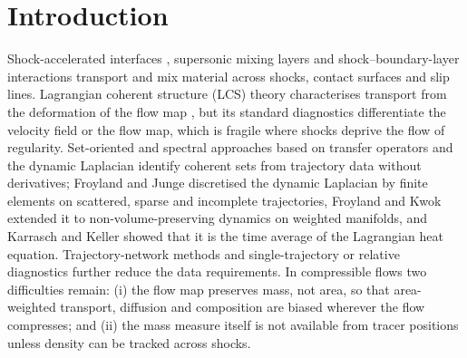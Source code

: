 \documentclass[11pt]{article}
\theoremstyle{definition}\newtheorem{definition}{Definition}\theoremstyle{remark}\newtheorem{remark}{Remark}
\begin{document}
\begin{abstract}
parts whose sum is exact; in three DNS both parts agree with the DNS velocity circulation of the same material triangles to within $3\%$, and per unit interface length it follows the Samtaney--Zabusky local law only on the upstream $45^\circ$. A tetrahedral ledger is exact across manufactured three-dimensional planar shocks. A noise propagation law, an adaptive anchoring rule and a per-track ledger for broken trajectories make the method applicable to particle-tracking data.
\end{abstract}

\section{Introduction}
Shock-accelerated interfaces \citep{HaasSturtevant1987,PiconeBoris1988,SamtaneyZabusky1994}, supersonic mixing layers and shock--boundary-layer interactions transport and mix material across shocks, contact surfaces and slip lines. Lagrangian coherent structure (LCS) theory characterises transport from the deformation of the flow map \citep{Haller2015,Hadjighasem2017}, but its standard diagnostics differentiate the velocity field or the flow map, which is fragile where shocks deprive the flow of regularity. Set-oriented and spectral approaches based on transfer operators and the dynamic Laplacian \citep{Froyland2015} identify coherent sets from trajectory data without derivatives; Froyland and Junge \citep{FroylandJunge2018} discretised the dynamic Laplacian by finite elements on scattered, sparse and incomplete trajectories, Froyland and Kwok \citep{FroylandKwok2020} extended it to non-volume-preserving dynamics on weighted manifolds, and Karrasch and Keller \citep{KarraschKeller2020} showed that it is the time average of the Lagrangian heat equation. Trajectory-network methods \citep{Iacobello2021,PadbergGehle2017,BanischKoltai2017} and single-trajectory or relative diagnostics \citep{Haller2021,Aksamit2024} further reduce the data requirements. In compressible flows two difficulties remain: (i) the flow map preserves mass, not area, so that area-weighted transport, diffusion and composition are biased wherever the flow compresses; and (ii) the mass measure itself is not available from tracer positions unless density can be tracked across shocks.
\end{document}
